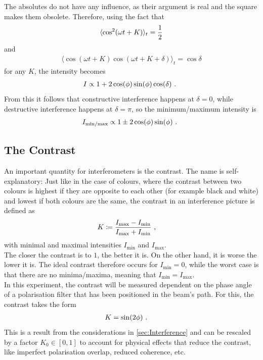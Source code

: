 The absolutes do not have any influence, as their argument is real and the square makes them obsolete. Therefore, using the fact that 
\begin{align}
  \langle \cos^2(\omega t + K)\rangle_t = \frac{1}{2}
\end{align}
and \begin{align}
  \langle \cos(\omega t + K)\cos(\omega t + K + \delta)\rangle_t = \cos{\delta}
\end{align}
for any $K$, the intensity becomes 
\begin{align}
  I \propto 1 + 2 \cos(\phi)\sin(\phi) \cos(\delta) \text{ . }
\end{align}
From this it follows that constructive interference happens at $\delta = 0$, while destructive interference happens at $\delta = \pi$, so the minimum/maximum intensity is 
\begin{align}
  I_\text{min/max} \propto 1 \pm 2 \cos(\phi)\sin(\phi) \text{ . }
\end{align}


\subsection{The Contrast}
An important quantity for interferometers is the contrast. The name is self-explanatory: Just like in the case of colours, where the contrast between two colours is highest if they are opposite to each other (for example black and white) and lowest if both colours are the same, the contrast in an interference picture is defined as 
\begin{align}
  K &\coloneqq \frac{I_\text{max}-I_\text{min}}{I_\text{max} + I_\text{min}} \text{ , }
  \label{eq:contrast}
\end{align}
with minimal and maximal intensities $I_\text{min}$ and $I_\text{max}$.\\
The closer the contrast is to $1$, the better it is. On the other hand, it is worse the lower it is. The ideal contrast therefore occurs for $I_\text{min}=0$, while the worst case is that there are no minima/maxima, meaning that $I_\text{min}=I_\text{max}$.\\
In this experiment, the contrast will be measured dependent on the phase angle of a polarisation filter that has been positioned in the beam's path. For this, the contrast takes the form 
\begin{align}
  \label{eq:contrast}
K &= \sin(2\phi) \text{ . }
\end{align}
This is a result from the considerations in \autoref{sec:Interference} and can be rescaled by a factor $K_0 \in [0,1]$ to account for physical effects that reduce the contrast, like imperfect polarisation overlap, reduced coherence, etc.


